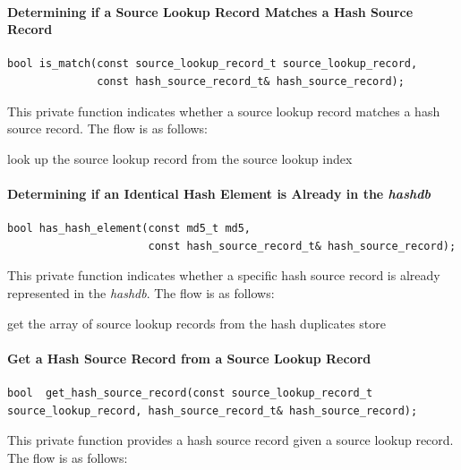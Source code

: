 \documentclass[12pt,twoside]{article}
\newcommand{\hdb}{\emph{hashdb}\xspace}
\begin{document}
\paragraph{Determining if a Source Lookup Record Matches a Hash Source Record}
\begin{small}
\begin{verbatim}
bool is_match(const source_lookup_record_t source_lookup_record,
              const hash_source_record_t& hash_source_record);
\end{verbatim}
\end{small}
This private function indicates whether a source lookup record
matches a hash source record.
The flow is as follows:

\begin{algorithmic}
  \RETURN \FALSE
\ENDIF
\STATE look up the source lookup record from the source lookup index
  \RETURN \TRUE
\ELSE
  \RETURN \FALSE
\ENDIF
\end{algorithmic}

\paragraph{Determining if an Identical Hash Element is Already in the \hdb}
\begin{small}
\begin{verbatim}
bool has_hash_element(const md5_t md5,
                      const hash_source_record_t& hash_source_record);
\end{verbatim}
\end{small}
This private function indicates whether a specific hash source record
is already represented in the \hdb.
The flow is as follows:

\begin{algorithmic}
  \RETURN \FALSE
\ENDIF
{}
    \RETURN \TRUE
  \ELSE
    \RETURN \FALSE
  \ENDIF
\ELSE
  \STATE get the array of source lookup records from the hash duplicates store
      \RETURN \TRUE
    \ENDIF
  \ENDFOR
  \RETURN \FALSE
\ENDIF
\end{algorithmic}

\paragraph{Get a Hash Source Record from a Source Lookup Record}
\begin{small}
\begin{verbatim}
bool  get_hash_source_record(const source_lookup_record_t source_lookup_record, hash_source_record_t& hash_source_record);
\end{verbatim}
\end{small}
This private function provides a hash source record
given a source lookup record.
The flow is as follows:
\end{document}
